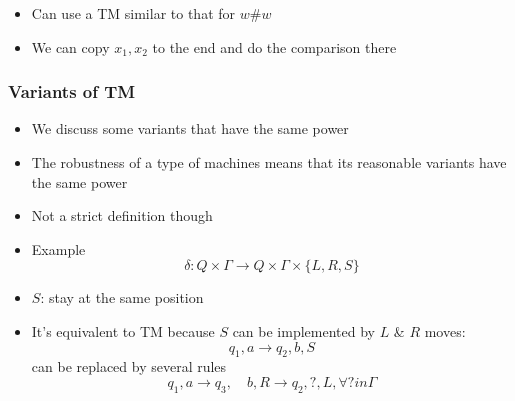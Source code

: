 \begin{frame}[allowframebreaks]
\begin{itemize}
\item [] Can use a TM similar to that for $w \# w$

\item We can copy $x_1, x_2$ to the end
  and do the comparison there
  





\end{itemize}\end{frame}

\begin{frame}[allowframebreaks] \frametitle{Variants of TM}
  \begin{itemize}
\item We discuss some variants that have the same power

\item
  The robustness of a type of machines means that its reasonable
variants have the same 
power

\item
  [] Not a strict definition though

\item Example
  \begin{equation*}
\delta: Q \times \Gamma\rightarrow Q \times \Gamma 
\times \{L, R, S\}
\end{equation*}
\item
  [] $S$: stay at the same position

\item
  It's equivalent to TM because $S$ can
  be implemented by $L$ \& $R$ moves:
  \begin{equation*}
      q_1,a \rightarrow q_2,b, S
    \end{equation*}
    can be replaced by several rules
    \begin{equation*}
q_1,a \rightarrow q_3, \quad b,R \rightarrow
q_2, ?, L, \forall ? in \Gamma 
\end{equation*}
\end{itemize}
\end{frame}

